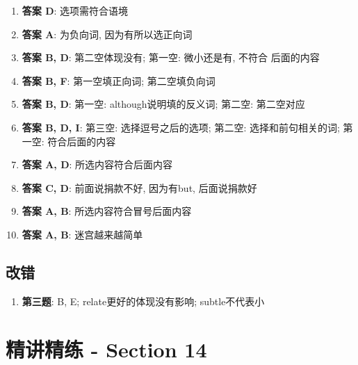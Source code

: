   \begin{enumerate}
    \item \textbf{答案 D}: 选项需符合语境
    \item \textbf{答案 A}: 为负向词, 因为有所以选正向词
    \item \textbf{答案 B, D}: 第二空体现没有; 第一空: 微小还是有, 不符合
    后面的内容
    \item \textbf{答案 B, F}: 第一空填正向词; 第二空填负向词
    \item \textbf{答案 B, D}: 第一空: although说明填的反义词;
    第二空: 第二空对应
    \item \textbf{答案 B, D, I}: 第三空: 选择逗号之后的选项; 第二空: 选择和前句相关的词;
    第一空: 符合后面的内容
    \item \textbf{答案 A, D}: 所选内容符合后面内容
    \item \textbf{答案 C, D}: 前面说捐款不好, 因为有but, 后面说捐款好
    \item \textbf{答案 A, B}: 所选内容符合冒号后面内容
    \item \textbf{答案 A, B}: 迷宫越来越简单
  \end{enumerate}

  \subsection{改错}

    \begin{enumerate}
      \item \textbf{第三题}: B, E; relate更好的体现没有影响; subtle不代表小
    \end{enumerate}

\section{精讲精练 - Section 14}

